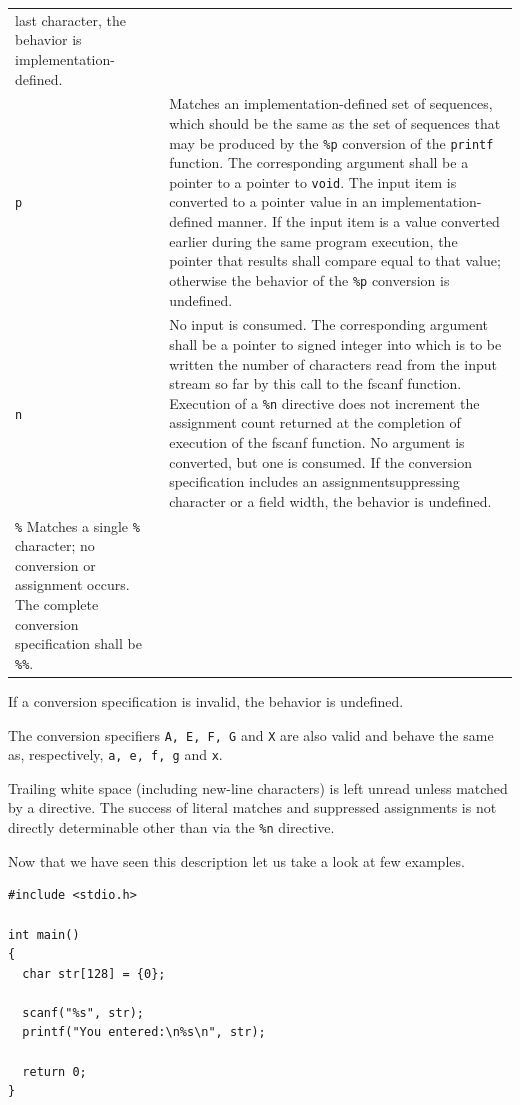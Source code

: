 \begin{longtable}{p{}p{}}
last character, the behavior is implementation-defined.\\
\texttt{p}&Matches an implementation-defined set of sequences, which should be
the same as the set of sequences that may be produced by the \texttt{\%p}
conversion of the \texttt{printf} function. The corresponding argument shall be
a pointer to a pointer to \texttt{void}. The input item is converted to a
pointer value in an implementation-defined manner. If the input item is a value
converted earlier during the same program execution, the pointer that results
shall compare equal to that value; otherwise the behavior of the \texttt{\%p}
conversion is undefined.\\
\texttt{n}&No input is consumed. The corresponding argument shall be a pointer
to signed integer into which is to be written the number of characters read
from the input stream so far by this call to the fscanf function. Execution of
a \texttt{\%n} directive does not increment the assignment count returned at
the completion of execution of the fscanf function. No argument is converted,
but one is consumed. If the conversion specification includes an
assignmentsuppressing character or a field width, the behavior is undefined.\\
\texttt{\%} Matches a single \texttt{\%} character; no conversion or assignment
occurs. The complete conversion specification shall be \texttt{\%\%}.
\end{longtable}

If a conversion specification is invalid, the behavior is undefined.

The conversion specifiers \texttt{A, E, F, G} and \texttt{X} are also valid and
behave the same as, respectively, \texttt{a, e, f, g} and \texttt{x}.

Trailing white space (including new-line characters) is left unread unless
matched by a directive. The success of literal matches and suppressed
assignments is not directly determinable other than via the \texttt{\%n}
directive.

Now that we have seen this description let us take a look at few examples.

\begin{Verbatim}[frame=single]
#include <stdio.h>

int main()
{
  char str[128] = {0};

  scanf("%s", str);
  printf("You entered:\n%s\n", str);

  return 0;
}
\end{Verbatim}

